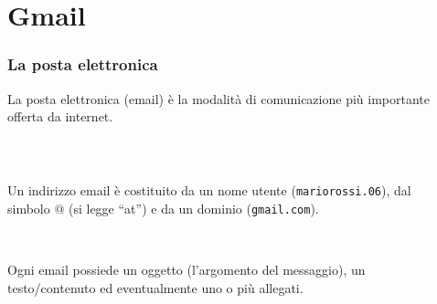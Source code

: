 \documentclass[]{beamer}
\begin{document}
\section{Gmail}


\begin{frame}
\frametitle{La posta elettronica}
La posta elettronica (\alert<1>{email}) è la modalità di comunicazione più importante offerta da internet.\pause

~

\begin{columns}
  \begin{column}{0.55\textwidth}
  Un indirizzo email è costituito da un nome utente (\texttt{mariorossi.06}), dal simbolo $@$ (si legge ``at'') e da un dominio (\texttt{gmail.com}).\pause

   ~
   
   Ogni email possiede un \alert<3>{oggetto} (l'argomento del messaggio), un \alert<3>{testo/contenuto} ed eventualmente uno o più \alert<3>{allegati}.
  \end{column}
  \begin{column}{0.37\textwidth}
  \end{column}
\end{columns}
\end{frame}
\end{document}
